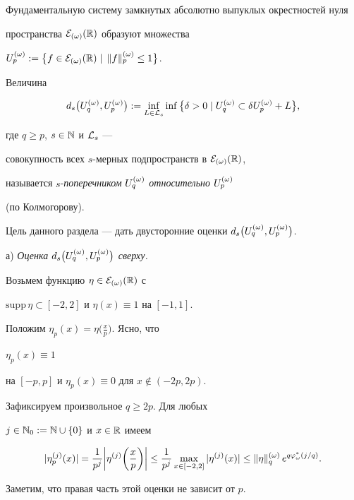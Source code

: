 Фундаментальную систему замкнутых абсолютно выпуклых окрестностей нуля 


пространства ${\cal E}_{(\omega)}(\Bbb R)$ образуют множества


$U^{(\omega)}_p:=\big\{f\in{\cal E}_{(\omega)}(\Bbb R)\mid\, \|f\|^{(\omega)}_p\leq 1\big\}$.


Величина 


$$


\dqp:=\inf_{L\in{\cal L}_s}\inf\big\{\d>0\mid \uqo\subset


\d\upo+L\big\},


$$


где $q\geq p$, $s\in\Bbb N$ и ${\cal L}_s$ ---


совокупность всех $s$-мерных подпространств в ${\cal E}_{(\omega)}(\Bbb R)$,


называется $s$-{\it поперечником} $U^{(\omega)}_q$ {\it относительно} $U^{(\omega)}_p$


(по Колмогорову).


Цель данного раздела --- дать двусторонние оценки $d_s\big(U^{(\omega)}_q, U^{(\omega)}_p\big)$.





а) {\it Оценка $d_s\big(U^{(\omega)}_q, U^{(\omega)}_p\big)$ сверху.}


Возьмем функцию $\eta\in{\cal E}_{(\omega)}(\Bbb R)$ с


$\mathrm{supp}\,\eta\subset[-2,2]$ и $\eta(x)\equiv1$ на $[-1,1]$. 


Положим $\eta_p(x)=\eta\big(\frac xp\big)$. Ясно, что


$\eta_p(x)\equiv1$


на $[-p,p]$ и $\eta_p(x)\equiv0$ для $x\notin(-2p,2p)$.





Зафиксируем произвольное $q\ge2p$. Для любых


$j\in\Bbb N_0:=\Bbb N\cup\{0\}$ и $x\in\Bbb R$ имеем


\begin{equation}\label{e:3}


|\eta_p^{(j)}(x)|=


\frac1{p^j}\bigg|\eta^{(j)}\bigg(\frac xp\bigg)\bigg|\le


\frac1{p^j}\max_{x\in[-2,2]}|\eta^{(j)}(x)|\le


\|\eta\|^{(\o)}_q\,e^{q\varphi_\omega^*(j/q)}.


\end{equation}


Заметим, что правая часть этой оценки не зависит от $p$.





